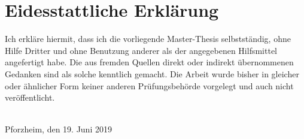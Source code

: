 
\section*{Eidesstattliche Erklärung}\label{declaration}

Ich erkläre hiermit, dass ich die vorliegende Master-Thesis
selbstständig, ohne Hilfe Dritter und ohne Benutzung anderer 
als der angegebenen Hilfsmittel angefertigt habe. 
Die aus fremden Quellen direkt oder indirekt übernommenen Gedanken 
sind als solche kenntlich gemacht. 
Die Arbeit wurde bisher in gleicher oder ähnlicher Form keiner anderen
Prüfungsbehörde vorgelegt und auch nicht veröffentlicht.


\vspace{3cm} \ \\
Pforzheim, den 19. Juni 2019
